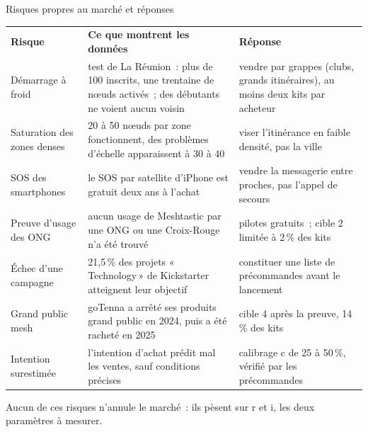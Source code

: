 \begin{frame}{Risques propres au marché et réponses}
  \centering
  \renewcommand{\arraystretch}{1.35}\scriptsize
  \begin{tabular}{@{}p{2.55cm}@{\hspace{6.5pt}}p{5.6cm}@{\hspace{6.5pt}}p{4.6cm}@{}}
    \rowcolor{insarose}\textcolor{insarouge}{\bfseries Risque} & \textcolor{insarouge}{\bfseries Ce que montrent les données} & \textcolor{insarouge}{\bfseries Réponse} \\
    Démarrage à froid & test de La Réunion~: plus de 100 inscrits, une trentaine de nœuds activés~; des débutants ne voient aucun voisin & vendre par grappes (clubs, grands itinéraires), au moins deux kits par acheteur \\
    Saturation des zones denses & 20 à 50 nœuds par zone fonctionnent, des problèmes d'échelle apparaissent à 30 à 40 & viser l'itinérance en faible densité, pas la ville \\
    SOS des smartphones & le SOS par satellite d'iPhone est gratuit deux ans à l'achat & vendre la messagerie entre proches, pas l'appel de secours \\
    Preuve d'usage des ONG & aucun usage de Meshtastic par une ONG ou une Croix-Rouge n'a été trouvé & pilotes gratuits~; cible 2 limitée à 2\,\% des kits \\
    Échec d'une campagne & 21,5\,\% des projets «\,Technology\,» de Kickstarter atteignent leur objectif & constituer une liste de précommandes avant le lancement \\
    Grand public mesh & goTenna a arrêté ses produits grand public en 2024, puis a été racheté en 2025 & cible 4 après la preuve, 14\,\% des kits \\
    Intention surestimée & l'intention d'achat prédit mal les ventes, sauf conditions précises & calibrage c de 25 à 50\,\%, vérifié par les précommandes \\
  \end{tabular}
  \vspace{0.1cm}
  \begin{pcompact}\centering\footnotesize
    Aucun de ces risques n'annule le marché~: ils pèsent sur r et i, les deux paramètres à mesurer.
  \end{pcompact}
\end{frame}

